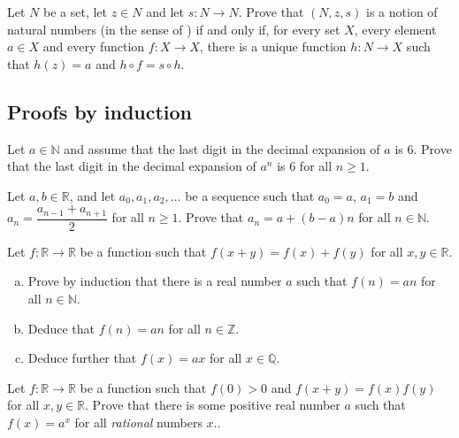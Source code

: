 \begin{chapex}
Let $N$ be a set, let $z \in N$ and let $s : N \to N$. Prove that $(N, z, s)$ is a notion of natural numbers (in the sense of ) if and only if, for every set $X$, every element $a \in X$ and every function $f : X \to X$, there is a unique function $h : N \to X$ such that $h(z)=a$ and $h \circ f = s \circ h$.
\end{chapex}

\subsection*{Proofs by induction}

\begin{chapex}
Let $a \in \mathbb{N}$ and assume that the last digit in the decimal expansion of $a$ is $6$. Prove that the last digit in the decimal expansion of $a^n$ is $6$ for all $n \ge 1$.
\end{chapex}

\begin{chapex}
Let $a,b \in \mathbb{R}$, and let $a_0, a_1, a_2, \dots$ be a sequence such that $a_0 = a$, $a_1=b$ and $a_n = \dfrac{a_{n-1} + a_{n+1}}{2}$ for all $n \ge 1$. Prove that $a_n = a + (b-a) n$ for all $n \in \mathbb{N}$.
\end{chapex}

\begin{chapex}
Let $f : \mathbb{R} \to \mathbb{R}$ be a function such that $f(x+y) = f(x) + f(y)$ for all $x,y \in \mathbb{R}$.
\begin{enumerate}[(a)]
\item Prove by induction that there is a real number $a$ such that $f(n) = an$ for all $n \in \mathbb{N}$.
\item Deduce that $f(n) = an$ for all $n \in \mathbb{Z}$.
\item Deduce further that $f(x) = ax$ for all $x \in \mathbb{Q}$.
\end{enumerate}
\end{chapex}

\begin{chapex}
Let $f : \mathbb{R} \to \mathbb{R}$ be a function such that $f(0) > 0$ and $f(x+y)=f(x)f(y)$ for all $x,y \in \mathbb{R}$. Prove that there is some positive real number $a$ such that $f(x)=a^x$ for all \textit{rational} numbers $x$..
\end{chapex}

